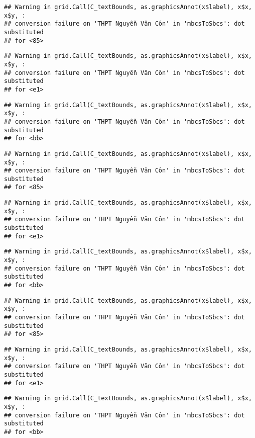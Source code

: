 \documentclass[
]{article}
\begin{document}
\begin{verbatim}
## Warning in grid.Call(C_textBounds, as.graphicsAnnot(x$label), x$x, x$y, :
## conversion failure on 'THPT Nguyễn Văn Côn' in 'mbcsToSbcs': dot substituted
## for <85>
\end{verbatim}

\begin{verbatim}
## Warning in grid.Call(C_textBounds, as.graphicsAnnot(x$label), x$x, x$y, :
## conversion failure on 'THPT Nguyễn Văn Côn' in 'mbcsToSbcs': dot substituted
## for <e1>
\end{verbatim}

\begin{verbatim}
## Warning in grid.Call(C_textBounds, as.graphicsAnnot(x$label), x$x, x$y, :
## conversion failure on 'THPT Nguyễn Văn Côn' in 'mbcsToSbcs': dot substituted
## for <bb>
\end{verbatim}

\begin{verbatim}
## Warning in grid.Call(C_textBounds, as.graphicsAnnot(x$label), x$x, x$y, :
## conversion failure on 'THPT Nguyễn Văn Côn' in 'mbcsToSbcs': dot substituted
## for <85>
\end{verbatim}

\begin{verbatim}
## Warning in grid.Call(C_textBounds, as.graphicsAnnot(x$label), x$x, x$y, :
## conversion failure on 'THPT Nguyễn Văn Côn' in 'mbcsToSbcs': dot substituted
## for <e1>
\end{verbatim}

\begin{verbatim}
## Warning in grid.Call(C_textBounds, as.graphicsAnnot(x$label), x$x, x$y, :
## conversion failure on 'THPT Nguyễn Văn Côn' in 'mbcsToSbcs': dot substituted
## for <bb>
\end{verbatim}

\begin{verbatim}
## Warning in grid.Call(C_textBounds, as.graphicsAnnot(x$label), x$x, x$y, :
## conversion failure on 'THPT Nguyễn Văn Côn' in 'mbcsToSbcs': dot substituted
## for <85>
\end{verbatim}

\begin{verbatim}
## Warning in grid.Call(C_textBounds, as.graphicsAnnot(x$label), x$x, x$y, :
## conversion failure on 'THPT Nguyễn Văn Côn' in 'mbcsToSbcs': dot substituted
## for <e1>
\end{verbatim}

\begin{verbatim}
## Warning in grid.Call(C_textBounds, as.graphicsAnnot(x$label), x$x, x$y, :
## conversion failure on 'THPT Nguyễn Văn Côn' in 'mbcsToSbcs': dot substituted
## for <bb>
\end{verbatim}
\end{document}
